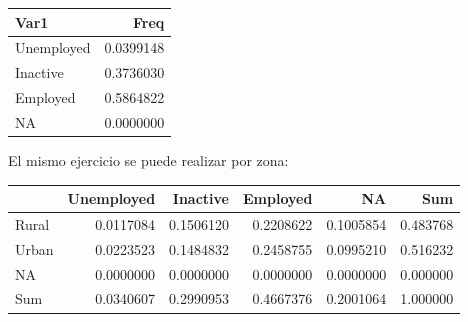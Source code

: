 \documentclass[
  spanish,
  12pt,
]{book}
\newenvironment{Shaded}{\begin{snugshade}}{\end{snugshade}}
\newcommand{\AttributeTok}[1]{\textcolor[rgb]{0.13,0.29,0.53}{#1}}
\newcommand{\FunctionTok}[1]{\textcolor[rgb]{0.13,0.29,0.53}{\textbf{#1}}}
\newcommand{\NormalTok}[1]{#1}
\newcommand{\SpecialCharTok}[1]{\textcolor[rgb]{0.81,0.36,0.00}{\textbf{#1}}}
\newcommand{\StringTok}[1]{\textcolor[rgb]{0.31,0.60,0.02}{#1}}
\begin{document}
\begin{Shaded}
\end{Shaded}

\begin{tabular}{l|r}
\hline
Var1 & Freq\\
\hline
Unemployed & 0.0399148\\
\hline
Inactive & 0.3736030\\
\hline
Employed & 0.5864822\\
\hline
NA & 0.0000000\\
\hline
\end{tabular}

El mismo ejercicio se puede realizar por zona:

\begin{Shaded}
\end{Shaded}

\begin{tabular}{l|r|r|r|r|r}
\hline
  & Unemployed & Inactive & Employed & NA & Sum\\
\hline
Rural & 0.0117084 & 0.1506120 & 0.2208622 & 0.1005854 & 0.483768\\
\hline
Urban & 0.0223523 & 0.1484832 & 0.2458755 & 0.0995210 & 0.516232\\
\hline
NA & 0.0000000 & 0.0000000 & 0.0000000 & 0.0000000 & 0.000000\\
\hline
Sum & 0.0340607 & 0.2990953 & 0.4667376 & 0.2001064 & 1.000000\\
\hline
\end{tabular}

\begin{Shaded}
\end{Shaded}
\end{document}
